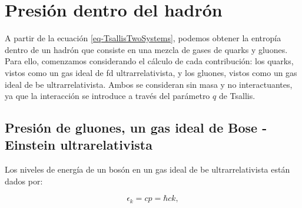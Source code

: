 

    
    

\section{Presión dentro del hadrón}\label{sec-PresTsa}

A partir de la ecuación \eqref{eq-TsallisTwoSystems}, podemos obtener la entropía dentro de un hadrón que consiste en una mezcla de gases de quarks y gluones. Para ello, comenzamos considerando el cálculo de cada contribución: los quarks, vistos como un gas ideal de \gls{fd} ultrarrelativista, y los gluones, vistos como un gas ideal de \gls{be} ultrarrelativista. Ambos se consideran sin masa y no interactuantes, ya que la interacción se introduce a través del parámetro \( q \) de Tsallis.

\subsection{Presión de gluones, un gas ideal de Bose - Einstein ultrarelativista}

Los niveles de energía de un bosón en un gas ideal de \gls{be} ultrarrelativista están dados por:

\begin{equation}
{\epsilon}_{k} = cp = \hbar c k,
\end{equation}

